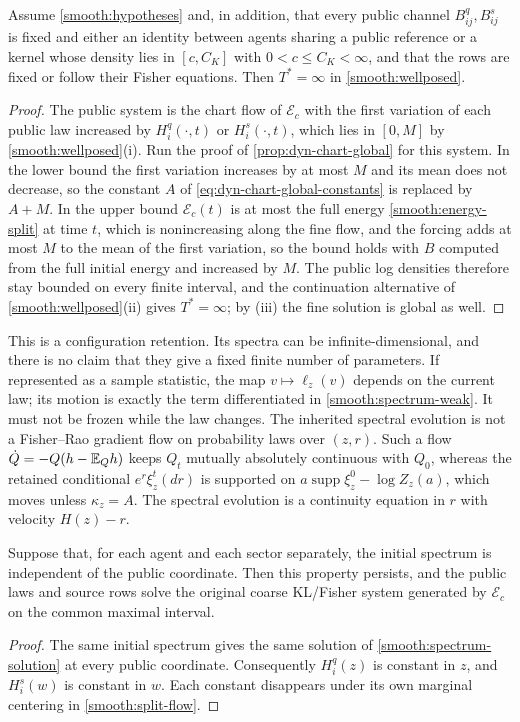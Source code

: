 Assume \cref{smooth:hypotheses} and, in addition, that every public channel $B_{ij}^q,B_{ij}^s$ is fixed and either an identity between agents sharing a public reference or a kernel whose density lies in $[c,C_K]$ with $0<c\leq C_K<\infty$, and that the rows are fixed or follow their Fisher equations. Then $T^*=\infty$ in \cref{smooth:wellposed}.
\begin{proof}
The public system is the chart flow of $\mathcal E_c$ with the first variation of each public law increased by $H_i^q(\cdot,t)$ or $H_i^s(\cdot,t)$, which lies in $[0,M]$ by \cref{smooth:wellposed}(i). Run the proof of \cref{prop:dyn-chart-global} for this system. In the lower bound the first variation increases by at most $M$ and its mean does not decrease, so the constant $A$ of \cref{eq:dyn-chart-global-constants} is replaced by $A+M$. In the upper bound $\mathcal E_c(t)$ is at most the full energy \cref{smooth:energy-split} at time $t$, which is nonincreasing along the fine flow, and the forcing adds at most $M$ to the mean of the first variation, so the bound holds with $B$ computed from the full initial energy and increased by $M$. The public log densities therefore stay bounded on every finite interval, and the continuation alternative of \cref{smooth:wellposed}(ii) gives $T^*=\infty$; by (iii) the fine solution is global as well.
\end{proof}

This is a configuration retention. Its spectra can be infinite-dimensional, and there is no claim that they give a fixed finite number of parameters. If represented as a sample statistic, the map $v\mapsto\ell_z(v)$ depends on the current law; its motion is exactly the term differentiated in \cref{smooth:spectrum-weak}. It must not be frozen while the law changes. The inherited spectral evolution is not a Fisher--Rao gradient flow on probability laws over $(z,r)$. Such a flow $\dot Q=-Q(h-\mathbb E_Qh)$ keeps $Q_t$ mutually absolutely continuous with $Q_0$, whereas the retained conditional $e^r\xi^t_z(dr)$ is supported on $a\operatorname{supp}\xi_z^0-\log Z_z(a)$, which moves unless $\kappa_z=A$. The spectral evolution is a continuity equation in $r$ with velocity $H(z)-r$.

Suppose that, for each agent and each sector separately, the initial spectrum is independent of the public coordinate. Then this property persists, and the public laws and source rows solve the original coarse KL/Fisher system generated by $\mathcal E_c$ on the common maximal interval.
\begin{proof}
The same initial spectrum gives the same solution of \cref{smooth:spectrum-solution} at every public coordinate. Consequently $H_i^q(z)$ is constant in $z$, and $H_i^s(w)$ is constant in $w$. Each constant disappears under its own marginal centering in \cref{smooth:split-flow}.
\end{proof}

